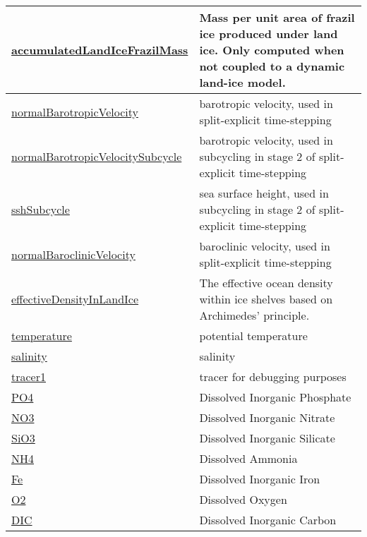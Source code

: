 {\begin{center}
\begin{longtable}{| p{2.0in} | p{4.0in} |}
    \hline
    \hyperref[subsec:var_sec_state_accumulatedLandIceFrazilMass]{accumulatedLandIceFrazilMass} & Mass per unit area of frazil ice produced under land ice.  Only computed when not coupled to a dynamic land-ice model. \\
    \hline
    \hyperref[subsec:var_sec_state_normalBarotropicVelocity]{normalBarotropicVelocity} & barotropic velocity, used in split-explicit time-stepping \\
    \hline
    \hyperref[subsec:var_sec_state_normalBarotropicVelocitySubcycle]{normalBarotropicVelocity\-Subcycle} & barotropic velocity, used in subcycling in stage 2 of split-explicit time-stepping \\
    \hline
    \hyperref[subsec:var_sec_state_sshSubcycle]{sshSubcycle} & sea surface height, used in subcycling in stage 2 of split-explicit time-stepping \\
    \hline
    \hyperref[subsec:var_sec_state_normalBaroclinicVelocity]{normalBaroclinicVelocity} & baroclinic velocity, used in split-explicit time-stepping \\
    \hline
    \hyperref[subsec:var_sec_state_effectiveDensityInLandIce]{effectiveDensityInLandIce} & The effective ocean density within ice shelves based on Archimedes' principle. \\
    \hline
    \hyperref[subsec:var_sec_state_temperature]{temperature} & potential temperature \\
    \hline
    \hyperref[subsec:var_sec_state_salinity]{salinity} & salinity \\
    \hline
    \hyperref[subsec:var_sec_state_tracer1]{tracer1} & tracer for debugging purposes \\
    \hline
    \hyperref[subsec:var_sec_state_PO4]{PO4} & Dissolved Inorganic Phosphate \\
    \hline
    \hyperref[subsec:var_sec_state_NO3]{NO3} & Dissolved Inorganic Nitrate \\
    \hline
    \hyperref[subsec:var_sec_state_SiO3]{SiO3} & Dissolved Inorganic Silicate \\
    \hline
    \hyperref[subsec:var_sec_state_NH4]{NH4} & Dissolved Ammonia \\
    \hline
    \hyperref[subsec:var_sec_state_Fe]{Fe} & Dissolved Inorganic Iron \\
    \hline
    \hyperref[subsec:var_sec_state_O2]{O2} & Dissolved Oxygen \\
    \hline
    \hyperref[subsec:var_sec_state_DIC]{DIC} & Dissolved Inorganic Carbon \\

\end{longtable}
\end{center}}

